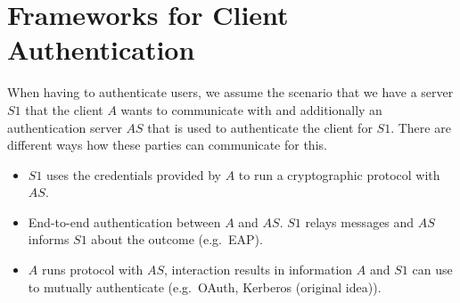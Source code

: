 
\section{Frameworks for Client Authentication}
When having to authenticate users, we assume the scenario that we have a server $S1$ that the client $A$ wants to communicate with and additionally an authentication server $AS$ that is used to authenticate the client for $S1$.
There are different ways how these parties can communicate for this.
\begin{itemize}
  \item $S1$ uses the credentials provided by $A$ to run a cryptographic protocol with $AS$.
  \item End-to-end authentication between $A$ and $AS$. $S1$ relays messages and $AS$ informs $S1$ about the outcome (e.g.\ EAP).
  \item $A$ runs protocol with $AS$, interaction results in information $A$ and $S1$ can use to mutually authenticate (e.g.\ OAuth, Kerberos (original idea)).
\end{itemize}

